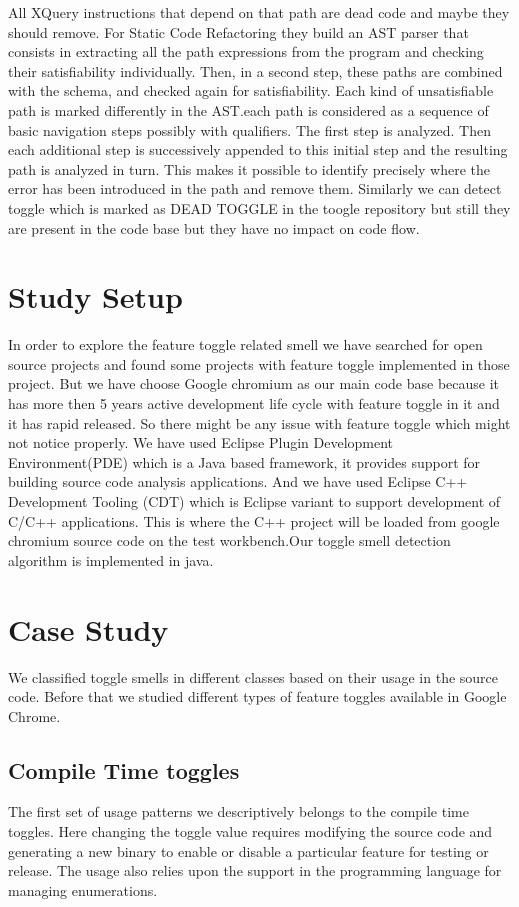 \documentclass[conference]{IEEEtran}
\begin{document}
All XQuery instructions that depend on that path are dead code and maybe they should remove. For Static Code Refactoring they build an AST parser that consists in extracting all the path expressions from the program and checking their satisfiability individually. Then, in a second step, these paths are combined with the schema, and checked again for satisfiability. Each kind of unsatisfiable path is marked differently in the AST.each path is considered as a sequence of basic navigation steps possibly with qualifiers. The first step is analyzed. Then each additional step is successively appended to this initial step and the resulting path is analyzed in turn. This makes it possible to identify precisely where the error has been introduced in the path and remove them. Similarly we can detect toggle which is marked as DEAD TOGGLE in the toogle repository but still they are present in the code base but they have no impact on code flow.\\

\section{Study Setup}
\label{study-setup}
In order to explore the feature toggle related smell we have searched for open source projects and found some projects with feature toggle implemented in those project. But we have choose Google chromium as our main code base because it has more then 5 years active development life cycle with feature toggle in it and it has rapid released. So there might be any issue with feature toggle which might not notice properly. We have used Eclipse Plugin Development Environment(PDE) which is a Java based framework, it provides support for building source code analysis applications. And we have used Eclipse C++ Development Tooling (CDT) which is Eclipse variant to support development of C/C++ applications. This is where the C++ project will be loaded from google chromium source code on the test workbench.Our toggle smell detection algorithm is implemented in java. 
\section{Case Study}
\label{results}
We classified toggle smells in different classes based on their usage in 
the source code. Before that we studied different types of feature toggles 
available in Google Chrome.

\subsection{Compile Time toggles}
The first set of usage patterns we descriptively belongs to the compile 
time toggles. Here changing the toggle value requires modifying the source 
code and generating a new binary to enable or disable a particular feature 
for testing or release. The usage also relies upon the support in the 
programming language for managing enumerations. 
\end{document}
